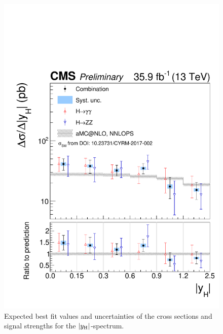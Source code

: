 \begin{figure}[hbtp]
  \begin{center}
    \includegraphics[width=\cmsFigWidth]{img/resultsapproval/reworked/spectra_rapidity.pdf}
    \caption{
        Expected best fit values and uncertainties of the cross sections and signal strengths for the $\left|y_\text{H}\right|$-spectrum.
        }
    \label{fig:CombinedSpectra_rapidity}
  \end{center}
\end{figure}

